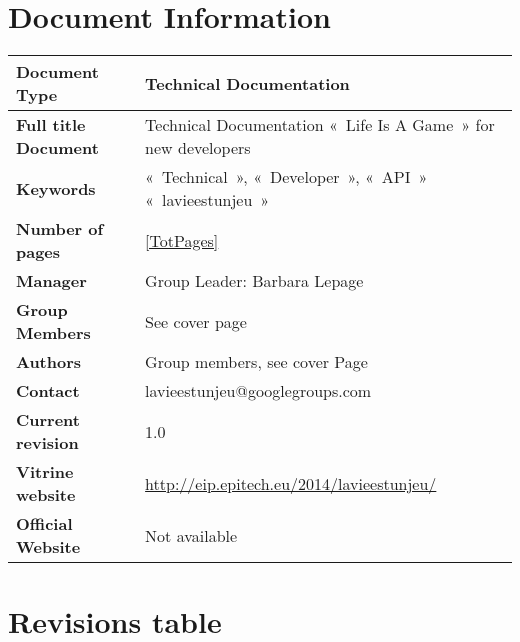 \documentclass{life-fr}
\begin{document}
\chapter*{Document Information}

\begin{tabular}{ | m{5cm} | m{10cm} | }
  \hline
  \textbf{Document Type} & Technical Documentation \\ %
  \hline
  \textbf{Full title Document} & Technical Documentation «~Life Is A Game~» for new developers \\%
  \hline
  \textbf{Keywords} & «~Technical~», «~Developer~», «~API~» «~lavieestunjeu~» \\%
  \hline
  \textbf{Number of pages} & \ref{TotPages} \\
  \hline
  \textbf{Manager} & Group Leader: Barbara Lepage \\
  \hline
  \textbf{Group Members} & See cover page \\
  \hline
  \textbf{Authors} & Group members, see cover Page \\
  \hline
  \textbf{Contact} & lavieestunjeu@googlegroups.com \\
  \hline
  \textbf{Current revision} & 1.0 \\%
  \hline
  \textbf{Vitrine website} & \url{http://eip.epitech.eu/2014/lavieestunjeu/} \\
  \hline
  \textbf{Official Website} & Not available \\
  \hline
\end{tabular}


\chapter *{Revisions table}

\listofrevisions
\end{document}
